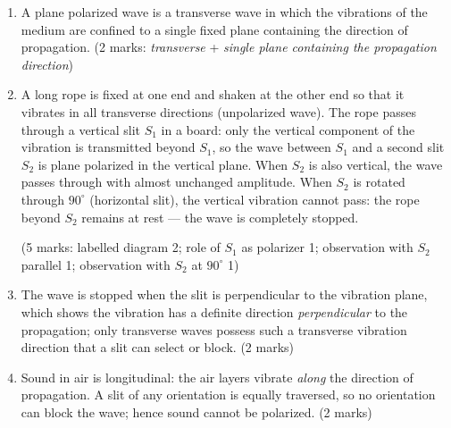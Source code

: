 \documentclass[11pt]{article}
\begin{document}
\begin{corrige}
\begin{enumerate}
\item A plane polarized wave is a transverse wave in which the vibrations of the medium are confined to a single fixed plane containing the direction of propagation. \hfill (2 marks: \emph{transverse} + \emph{single plane containing the propagation direction})
\item A long rope is fixed at one end and shaken at the other end so that it vibrates in all transverse directions (unpolarized wave). The rope passes through a vertical slit $S_1$ in a board: only the vertical component of the vibration is transmitted beyond $S_1$, so the wave between $S_1$ and a second slit $S_2$ is plane polarized in the vertical plane. When $S_2$ is also vertical, the wave passes through with almost unchanged amplitude. When $S_2$ is rotated through $90^{\circ}$ (horizontal slit), the vertical vibration cannot pass: the rope beyond $S_2$ remains at rest --- the wave is completely stopped.
\begin{center}
\end{center}
\hfill (5 marks: labelled diagram 2; role of $S_1$ as polarizer 1; observation with $S_2$ parallel 1; observation with $S_2$ at $90^{\circ}$ 1)
\item The wave is stopped when the slit is perpendicular to the vibration plane, which shows the vibration has a definite direction \emph{perpendicular} to the propagation; only transverse waves possess such a transverse vibration direction that a slit can select or block. \hfill (2 marks)
\item Sound in air is longitudinal: the air layers vibrate \emph{along} the direction of propagation. A slit of any orientation is equally traversed, so no orientation can block the wave; hence sound cannot be polarized. \hfill (2 marks)

\end{enumerate}
\end{corrige}
\end{document}
